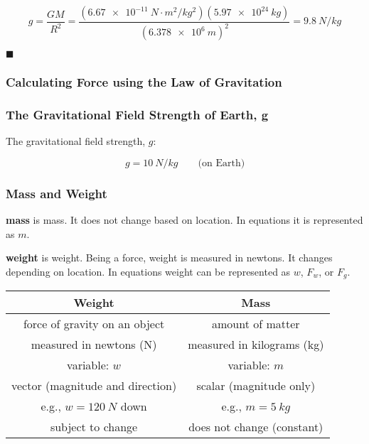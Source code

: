 \documentclass[dvipsnames]{article}
\begin{document}
\begin{equation*}
    g = \frac{GM}{R^2} = \frac{(\SI{6.67e-11}{N\cdot m^2/kg^2})(\SI{5.97e24}{kg})}{(\SI{6.378e6}{m})^2} = \boxed{\SI{9.8}{N/kg}}
\end{equation*}

\hfill $\blacksquare$

\subsubsection{Calculating Force using the Law of Gravitation}

\subsubsection{The Gravitational Field Strength of Earth, g}


The gravitational field strength, $g$:

\begin{equation*}
    g = \SI{10}{N/kg} \qquad \text{(on Earth)}
\end{equation*}

\subsubsection{Mass and Weight}

\textbf{\Gls{mass}} is \glsdesc{mass}. It does not change based on location. In equations it is represented as $m$.

\textbf{\Gls{weight}} is \glsdesc{weight}. Being a force, weight is measured in newtons. It changes depending on location. In equations weight can be represented as $w$, $F_w$, or $F_g$.

\begin{center}
    \begin{tabular}{c|c}
        \textbf{Weight} & \textbf{Mass} \\ \hline
        force of gravity on an object & amount of matter \\ \hline
        measured in newtons (N) & measured in kilograms (kg) \\ \hline
        variable: $w$ & variable: $m$ \\ \hline
        vector (magnitude and direction) & scalar (magnitude only) \\ \hline
        e.g., $w = \SI{120}{N}$ down & e.g., $m = \SI{5}{kg}$ \\ \hline
        subject to change & does not change (constant) 
    \end{tabular}
\end{center}
\end{document}
